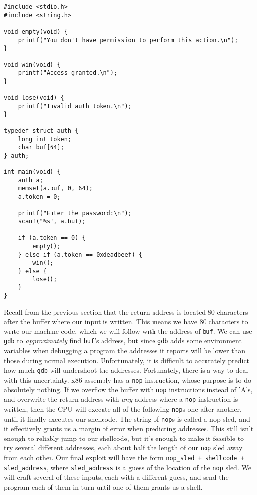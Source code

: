 \begin{lstlisting}
#include <stdio.h>
#include <string.h>

void empty(void) {
    printf("You don't have permission to perform this action.\n");
}

void win(void) {
    printf("Access granted.\n");
}

void lose(void) {
    printf("Invalid auth token.\n");
}

typedef struct auth {
    long int token;
    char buf[64];
} auth;

int main(void) {
    auth a;
    memset(a.buf, 0, 64);
    a.token = 0;

    printf("Enter the password:\n");
    scanf("%s", a.buf);

    if (a.token == 0) {
        empty();
    } else if (a.token == 0xdeadbeef) {
        win();
    } else {
        lose();
    }
}
\end{lstlisting}

Recall from the previous section that the return address is located 80
characters after the buffer where our input is written. This means we have 80
characters to write our machine code, which we will follow with the address of
\texttt{buf}. We can use \texttt{gdb} to \emph{approximately} find
\texttt{buf}'s address, but since \texttt{gdb} adds some environment variables
when debugging a program the addresses it reports will be lower than those
during normal execution. Unfortunately, it is difficult to accurately predict
how much \texttt{gdb} will undershoot the addresses. Fortunately, there is a way
to deal with this uncertainty. x86 assembly has a \texttt{nop} instruction,
whose purpose is to do absolutely nothing. If we overflow the buffer with
\texttt{nop} instructions instead of 'A's, and overwrite the return address with
\emph{any} address where a \texttt{nop} instruction is written, then the CPU
will execute all of the following \texttt{nop}s one after another, until it
finally executes our shellcode. The string of \texttt{nop}s is called a nop
sled, and it effectively grants us a margin of error when predicting addresses.
This still isn't enough to reliably jump to our shellcode, but it's enough to
make it feasible to try several different addresses, each about half the length
of our \texttt{nop} sled away from each other. Our final exploit will have the
form \texttt{nop\_sled + shellcode + sled\_address}, where
\texttt{sled\_address} is a guess of the location of the \texttt{nop} sled. We
will craft several of these inputs, each with a different guess, and send the
program each of them in turn until one of them grants us a shell.


